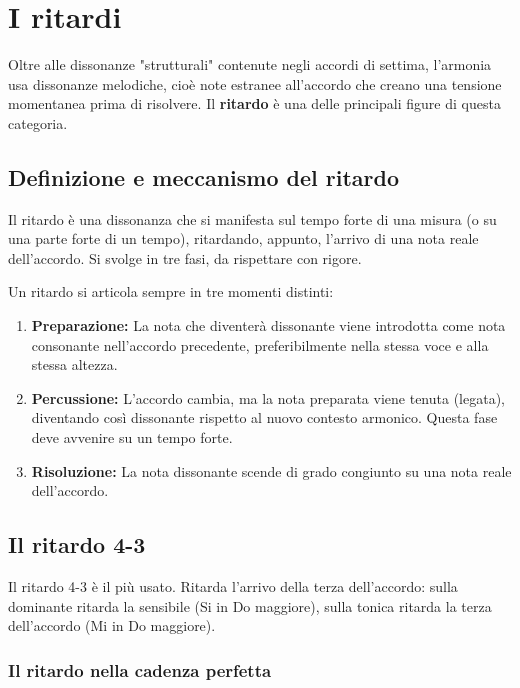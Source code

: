 \chapter{I ritardi}
\label{chap:ritardi}

Oltre alle dissonanze "strutturali" contenute negli accordi di settima, l'armonia usa dissonanze melodiche, cioè note estranee all'accordo che creano una tensione momentanea prima di risolvere. Il \textbf{ritardo} è una delle principali figure di questa categoria.

\section{Definizione e meccanismo del ritardo}
\label{sec:definizione_ritardo}

Il ritardo è una dissonanza che si manifesta sul tempo forte di una misura (o su una parte forte di un tempo), ritardando, appunto, l'arrivo di una nota reale dell'accordo. Si svolge in tre fasi, da rispettare con rigore.

\begin{definizione}
	\label{def:fasi_ritardo}
	Un ritardo si articola sempre in tre momenti distinti:
	\begin{enumerate}
		\item \textbf{Preparazione:} La nota che diventerà dissonante viene introdotta come nota consonante nell'accordo precedente, preferibilmente nella stessa voce e alla stessa altezza.
		\item \textbf{Percussione:} L'accordo cambia, ma la nota preparata viene tenuta (legata), diventando così dissonante rispetto al nuovo contesto armonico. Questa fase deve avvenire su un tempo forte.
		\item \textbf{Risoluzione:} La nota dissonante scende di grado congiunto su una nota reale dell'accordo.
	\end{enumerate}
\end{definizione}

\section{Il ritardo 4-3}
\label{sec:ritardo_4_3}

Il ritardo 4-3 è il più usato. Ritarda l'arrivo della terza dell'accordo: sulla dominante ritarda la sensibile (Si in Do maggiore), sulla tonica ritarda la terza dell'accordo (Mi in Do maggiore).

\subsection{Il ritardo nella cadenza perfetta}
\label{subsec:ritardo_cadenza}

